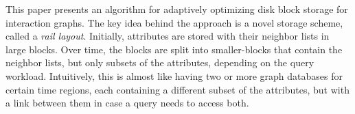 This paper presents an algorithm for adaptively optimizing disk block storage
for interaction graphs. The key idea behind the approach is a novel storage
scheme, called a \emph{rail layout}.  Initially, attributes are stored with
their neighbor lists in large blocks. Over time, the blocks are split into
smaller-blocks that contain the neighbor lists, but only subsets of the
attributes, depending on the query workload. Intuitively, this is almost like
having two or more graph databases for certain time regions, each containing a
different subset of the attributes, but with a link between them in case a query
needs to access both.




